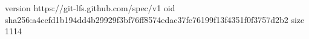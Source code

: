 version https://git-lfs.github.com/spec/v1
oid sha256:a4cefd1b194dd4b29929f3bf76ff8574edac37fe76199f13f4351f0f3757d2b2
size 1114
